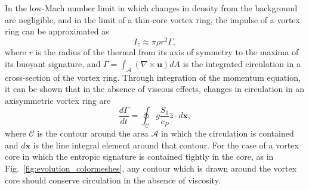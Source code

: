 \documentclass[twocolumn, amsmath, amsfonts, amssymb, trackchanges]{aastex62}
\newcommand{\grad}{\ensuremath{\nabla}}
\begin{document}
In the low-Mach number limit in which changes in density from the background are negligible, and in the limit of a thin-core vortex ring, the impulse of a vortex ring can be approximated as
\begin{equation}
I_z \approx \pi \rho r^2 \Gamma,
\label{eqn:impulse_approx}
\end{equation}
where $r$ is the radius of the thermal from its axis of symmetry to the maxima of its buoyant signature, and $\Gamma = \int_{\mathcal{A}} (\grad\times\bm{u})dA$ is the integrated circulation in a cross-section of the vortex ring.
Through integration of the momentum equation, it can be shown that in the absence of viscous effects, changes in circulation in an axisymmetric vortex ring are
\begin{equation}
\frac{d\Gamma}{dt} = \oint_{\mathcal{C}} g \frac{S_1}{c_P}\hat{z} \cdot d\bm{x},
\label{eqn:circulation}
\end{equation}
where $\mathcal{C}$ is the contour around the area $\mathcal{A}$ in which the circulation is contained and $d\bm{x}$ is the line integral element around that contour.
For the case of a vortex core in which the entropic signature is contained tightly in the core, as in Fig.~\ref{fig:evolution_colormeshes}, any contour which is drawn around the vortex core should conserve circulation in the absence of viscosity.
\end{document}
